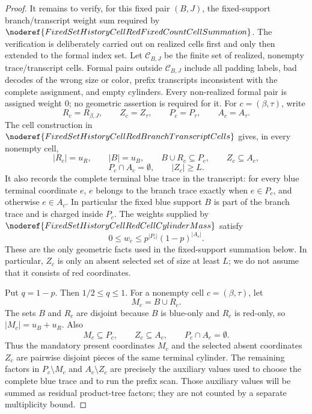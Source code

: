 \begin{proof}
It remains to verify, for this fixed pair \((B,J)\), the fixed-support
branch/transcript weight sum required by
\(\noderef{FixedSetHistoryCellRedFixedCountCellSummation}\).  The
verification is deliberately carried out on realized cells first and only
then extended to the formal index set.  Let
\(\mathcal C_{B,J}\) be the finite set of realized, nonempty
trace/transcript cells.  Formal pairs outside \(\mathcal C_{B,J}\) include
all padding labels, bad decodes of the wrong size or color, prefix
transcripts inconsistent with the complete assignment, and empty cylinders.
Every non-realized formal pair is assigned weight \(0\); no geometric
assertion is required for it.
For \(c=(\beta,\tau)\), write
\[
R_c=R_{\beta,J},\qquad
Z_c=Z_\tau,\qquad
P_c=P_\tau,\qquad
A_c=A_\tau .
\]
The cell construction in
\(\noderef{FixedSetHistoryCellRedBranchTranscriptCells}\) gives, in every
nonempty cell,
\[
|R_c|=u_R,\qquad |B|=u_B,\qquad
B\cup R_c\subseteq P_c,\qquad Z_c\subseteq A_c,
\]
\[
P_c\cap A_c=\emptyset,\qquad |Z_c|\ge L.
\]
It also records the complete terminal blue trace in the transcript: for
every blue terminal coordinate \(e\), \(e\) belongs to the branch trace
exactly when \(e\in P_c\), and otherwise \(e\in A_c\).  In particular the
fixed blue support \(B\) is part of the branch trace and is charged inside
\(P_c\).
The weights supplied by
\(\noderef{FixedSetHistoryCellRedCellCylinderMass}\) satisfy
\[
0\le w_c\le p^{|P_c|}(1-p)^{|A_c|}.
\]
These are the only geometric facts used in the fixed-support summation below.
In particular, \(Z_c\) is only an absent selected set of size at least \(L\);
we do not assume that it consists of red coordinates.

Put \(q=1-p\).  Then \(1/2\le q\le1\).  For a nonempty cell
\(c=(\beta,\tau)\), let
\[
M_c=B\cup R_c.
\]
The sets \(B\) and \(R_c\) are disjoint because \(B\) is blue-only and
\(R_c\) is red-only, so \(|M_c|=u_B+u_R\).  Also
\[
M_c\subseteq P_c,\qquad Z_c\subseteq A_c,\qquad P_c\cap A_c=\emptyset.
\]
Thus the mandatory present coordinates \(M_c\) and the selected absent
coordinates \(Z_c\) are pairwise disjoint pieces of the same terminal
cylinder.  The remaining factors in
\(P_c\setminus M_c\) and \(A_c\setminus Z_c\) are precisely the auxiliary
values used to choose the complete blue trace and to run the prefix scan.
Those auxiliary values will be summed as residual product-tree factors; they
are not counted by a separate multiplicity bound.


\end{proof}
